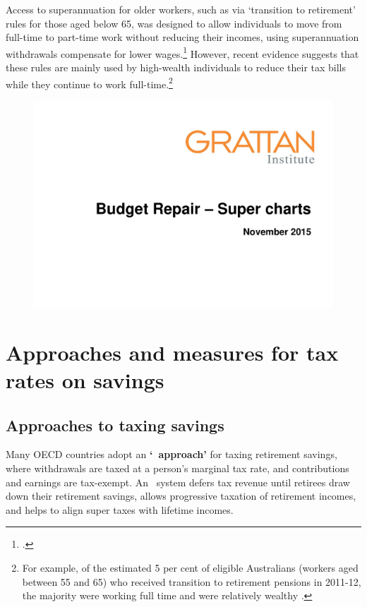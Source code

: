 \begin{subappendices}
\begin{figure}
\end{figure}

Access to superannuation for older workers, such as via ‘transition to retirement’ rules for those aged below 65, was designed to allow individuals to move from full-time to part-time work without reducing their incomes, using superannuation withdrawals compensate for lower wages.\footcite{ASIC2015TransitionToRetirement}  However, recent evidence suggests that these rules are mainly used by high-wealth individuals to reduce their tax bills while they continue to work full-time.\footnote{For example, of the estimated 5 per cent of eligible Australians (workers aged between 55 and 65) who received transition to retirement pensions in 2011-12, the majority were working full time and were relatively wealthy \textcite[][20]{ProductivityCommission2015SuperPolicyPostRetirement}.}

\begin{figure}
\label{fig:SUPER-B-2}
\includegraphics[width=\columnwidth,page=50]{super-atlas/PPTX.pdf}
\end{figure}  



\chapter{Approaches and measures for tax rates on savings}\label{appendix:SUPER-approaches-measures-for-tax-rates-on-savings}\label{appendix:SUPER-C}
\section{Approaches to taxing savings\label{appendix:SUPER-C-1}}
Many OECD countries adopt an \textbf{‘\EET\ approach’} for taxing retirement savings, where withdrawals are taxed at a person’s marginal tax rate, and contributions and earnings are tax-exempt. An \EET\ system defers tax revenue until retirees draw down their retirement savings, allows progressive taxation of retirement incomes, and helps to align super taxes with lifetime incomes.


\end{subappendices}

